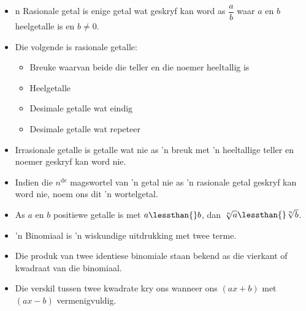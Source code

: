 \begin{itemize}[itemsep=5pt, label=\textbullet{}]

\item n Rasionale getal is enige getal wat geskryf kan word as $\dfrac{a}{b}$
waar $a$ en $b$ heelgetalle is en $b\ne 0$.
\item Die volgende is rasionale getalle:
    \begin{itemize}[noitemsep]
	\item Breuke waarvan beide die teller en die noemer heeltallig is
	\item Heelgetalle
	\item Desimale getalle wat eindig
	\item Desimale getalle wat repeteer
    \end{itemize}
\item Irrasionale getalle is getalle wat nie as ’n breuk met ’n heeltallige teller en noemer geskryf kan word nie.
\item Indien die ${n}^{\mathrm{de}}$ magswortel van ’n getal nie as ’n rasionale getal geskryf kan word nie, noem ons dit ’n wortelgetal.
\item As $a$ en $b$ positiewe getalle is met $a\lessthan{}b$, dan $\sqrt[n]{a}\lessthan{}\sqrt[n]{b}$.
\item ’n Binomiaal is ’n wiskundige uitdrukking met twee terme.
\item Die produk van twee identiese binomiale staan bekend as die vierkant of kwadraat van die binomiaal. 
\item Die verskil tussen twee kwadrate kry ons wanneer ons $(ax+b)$ met $(ax-b)$ vermenigvuldig.

\end{itemize}
